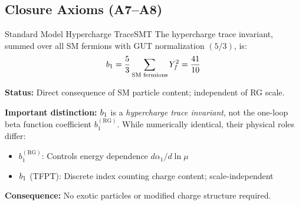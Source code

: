 \subsection{Closure Axioms (A7--A8)}

\begin{axiom}{Standard Model Hypercharge Trace}{SMT}
The hypercharge trace invariant, summed over all SM fermions with GUT normalization 
$(5/3)$, is:
\begin{equation}
    b_1 = \frac{5}{3} \sum_{\text{SM fermions}} Y_f^2 = \frac{41}{10}
\end{equation}

\tcblower
\textbf{Status:} Direct consequence of SM particle content; independent of RG scale.

\textbf{Important distinction:} $b_1$ is a \emph{hypercharge trace invariant}, 
not the one-loop beta function coefficient $b_1^{(\text{RG})}$. While numerically 
identical, their physical roles differ:
\begin{itemize}[leftmargin=1.5em, topsep=2pt, itemsep=1pt]
    \item $b_1^{(\text{RG})}$: Controls energy dependence $d\alpha_1/d\ln\mu$
    \item $b_1$ (TFPT): Discrete index counting charge content; scale-independent
\end{itemize}

\textbf{Consequence:} No exotic particles or modified charge structure required.
\end{axiom}

